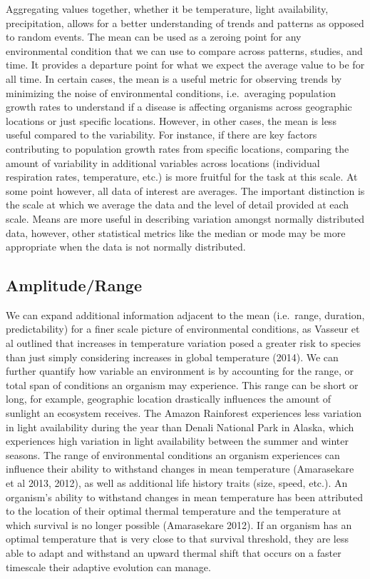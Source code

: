\documentclass[12pt,twoside]{reedthesis}
\begin{document}
Aggregating values together, whether it be temperature, light availability, precipitation, allows for a better understanding of trends and patterns as opposed to random events. The mean can be used as a zeroing point for any environmental condition that we can use to compare across patterns, studies, and time. It provides a departure point for what we expect the average value to be for all time. In certain cases, the mean is a useful metric for observing trends by minimizing the noise of environmental conditions, i.e.~averaging population growth rates to understand if a disease is affecting organisms across geographic locations or just specific locations. However, in other cases, the mean is less useful compared to the variability. For instance, if there are key factors contributing to population growth rates from specific locations, comparing the amount of variability in additional variables across locations (individual respiration rates, temperature, etc.) is more fruitful for the task at this scale. At some point however, all data of interest are averages. The important distinction is the scale at which we average the data and the level of detail provided at each scale. Means are more useful in describing variation amongst normally distributed data, however, other statistical metrics like the median or mode may be more appropriate when the data is not normally distributed.

\hypertarget{amplituderange}{%
\subsection{Amplitude/Range}\label{amplituderange}}

We can expand additional information adjacent to the mean (i.e.~range, duration, predictability) for a finer scale picture of environmental conditions, as Vasseur et al outlined that increases in temperature variation posed a greater risk to species than just simply considering increases in global temperature (2014). We can further quantify how variable an environment is by accounting for the range, or total span of conditions an organism may experience. This range can be short or long, for example, geographic location drastically influences the amount of sunlight an ecosystem receives. The Amazon Rainforest experiences less variation in light availability during the year than Denali National Park in Alaska, which experiences high variation in light availability between the summer and winter seasons. The range of environmental conditions an organism experiences can influence their ability to withstand changes in mean temperature (Amarasekare et al 2013, 2012), as well as additional life history traits (size, speed, etc.). An organism's ability to withstand changes in mean temperature has been attributed to the location of their optimal thermal temperature and the temperature at which survival is no longer possible (Amarasekare 2012). If an organism has an optimal temperature that is very close to that survival threshold, they are less able to adapt and withstand an upward thermal shift that occurs on a faster timescale their adaptive evolution can manage.
\end{document}
